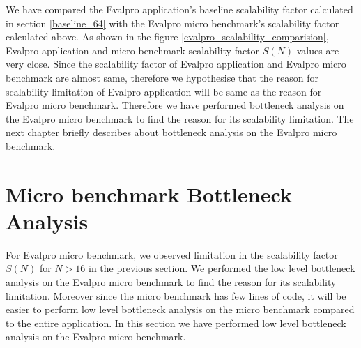 \documentclass{iitbreport}
\begin{document}
We have compared the Evalpro application's  baseline scalability factor calculated in section \ref{baseline_64} with the Evalpro micro benchmark's scalability factor calculated above. As shown in the figure \ref{evalpro_scalability_comparision}, Evalpro application and micro benchmark scalability factor $S(N)$ values are very close. Since  the scalability factor of Evalpro application and Evalpro micro benchmark are almost same, therefore we hypothesise that the reason for scalability limitation of Evalpro application will be same as the reason for Evalpro micro benchmark. Therefore we have performed bottleneck analysis on the Evalpro micro benchmark to find the reason for its scalability limitation. The next chapter briefly describes about bottleneck analysis on the Evalpro micro benchmark.



\chapter{Micro benchmark Bottleneck Analysis}\label{micro_benchmark_bottleneck_analysis}

For Evalpro micro benchmark, we observed  limitation in the scalability factor $S(N)$ for $N>16$ in the previous section. We performed the low level bottleneck analysis on the Evalpro micro benchmark to find the reason for its scalability limitation. Moreover since the micro benchmark has few lines of code, it will be easier to perform low level bottleneck analysis on the micro benchmark compared to the entire application. In this section we have performed low level bottleneck analysis on the Evalpro micro benchmark.
\end{document}
